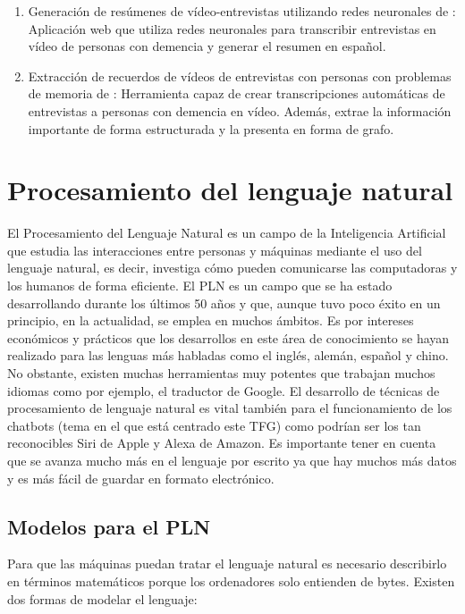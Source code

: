 \begin{enumerate}
	\item Generación de resúmenes de vídeo-entrevistas utilizando redes neuronales de \cite{dalcazar}: Aplicación web que utiliza redes neuronales para transcribir entrevistas en vídeo de personas con demencia y generar el resumen en español.
	\item Extracción de recuerdos de vídeos de entrevistas con personas con problemas de memoria de \cite{hgarcia}: Herramienta capaz de crear transcripciones automáticas de entrevistas a personas con demencia en vídeo. Además, extrae la información importante de forma estructurada y la presenta en forma de grafo. 
\end{enumerate}

\section{Procesamiento del lenguaje natural}

El Procesamiento del Lenguaje Natural \citep{pln} es un campo de la Inteligencia Artificial que estudia las interacciones entre personas y máquinas mediante el uso del lenguaje natural, es decir, investiga cómo pueden comunicarse las computadoras y los humanos de forma eficiente. El PLN es un campo que se ha estado desarrollando durante los últimos 50 años y que, aunque tuvo poco éxito en un principio, en la actualidad, se emplea en muchos ámbitos. Es por intereses económicos y prácticos que los desarrollos en este área de conocimiento se hayan realizado para las lenguas más habladas como el inglés, alemán, español y chino. No obstante, existen muchas herramientas muy potentes que trabajan muchos idiomas como por ejemplo, el traductor de Google. El desarrollo de técnicas de procesamiento de lenguaje natural es vital también para el funcionamiento de los chatbots (tema en el que está centrado este TFG) como podrían ser los tan reconocibles Siri de Apple y Alexa de Amazon. Es importante tener en cuenta que se avanza mucho más en el lenguaje por escrito ya que hay muchos más datos y es más fácil de guardar en formato electrónico.


\subsection{Modelos para el PLN}

Para que las máquinas puedan tratar el lenguaje natural es necesario describirlo en términos matemáticos porque los ordenadores solo entienden de bytes. Existen dos formas de modelar el lenguaje:

